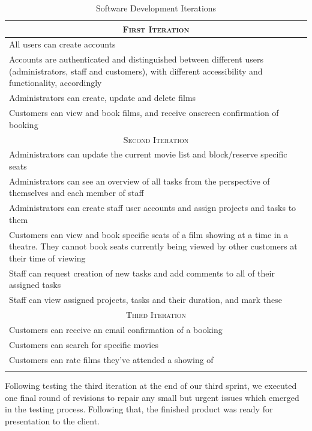 \documentclass[11pt, english]{article}
\begin{document}
	\begin{center}
		\scriptsize
	\begin{longtable}{p{14cm}}
		\hline
		\multicolumn{1}{c}{\textsc{First Iteration}}\\
		\hline
		All users can create accounts\\
		Accounts are authenticated and distinguished between different users (administrators, staff and customers), with different accessibility and functionality, accordingly\\
		Administrators can create, update and delete films\\
		Customers can view and book films, and receive onscreen confirmation of booking\\
		\hline
		\multicolumn{1}{c}{\textsc{Second Iteration}}\\
		\hline
		Administrators can update the current movie list and block/reserve specific seats\\
		Administrators can see an overview of all tasks from the perspective of themselves and each member of staff\\
		Administrators can create staff user accounts and assign projects and tasks to them\\
		Customers can view and book specific seats of a film showing at a time in a theatre. They cannot book seats currently being viewed by other customers at their time of viewing\\
		Staff can request creation of new tasks and add comments to all of their assigned tasks\\
		Staff can view assigned projects, tasks and their duration, and mark these\\
		\hline
		\multicolumn{1}{c}{\textsc{Third Iteration}}\\
		\hline
		Customers can receive an email confirmation of a booking\\
		Customers can search for specific movies\\
		Customers can rate films they've attended a showing of\\
		\hline
		\caption{Software Development Iterations}
	\end{longtable}
	\end{center}

	Following testing the third iteration at the end of our third sprint, we executed one final round of revisions to repair any small but urgent issues which emerged in the testing process. Following that, the finished product was ready for presentation to the client.
\end{document}
